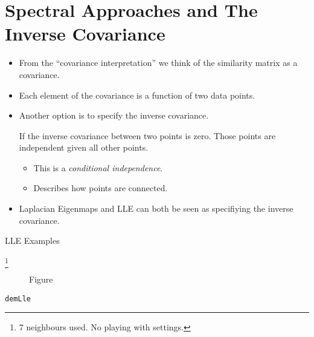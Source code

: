 \chapter{Spectral Approaches and The Inverse Covariance}

\begin{itemize}
\item From the {}``covariance interpretation'' we think of the similarity
matrix as a covariance.
\item Each element of the covariance is a function of two data points.
\item Another option is to specify the inverse covariance.


If the inverse covariance between two points is zero. Those points
are independent given all other points.
\begin{itemize}
\item This is a \emph{conditional independence}. 
\item Describes how points are connected.
\end{itemize}
\item Laplacian Eigenmaps and LLE can both be seen as specifiying the inverse
covariance.
\end{itemize}
LLE Examples

%
\footnote{7 neighbours used. No playing with settings.%
}

%
\begin{figure}
\hfill{}


\hfill{}

\hfill{}\caption{Figure}

\end{figure}


\texttt{demLle}

